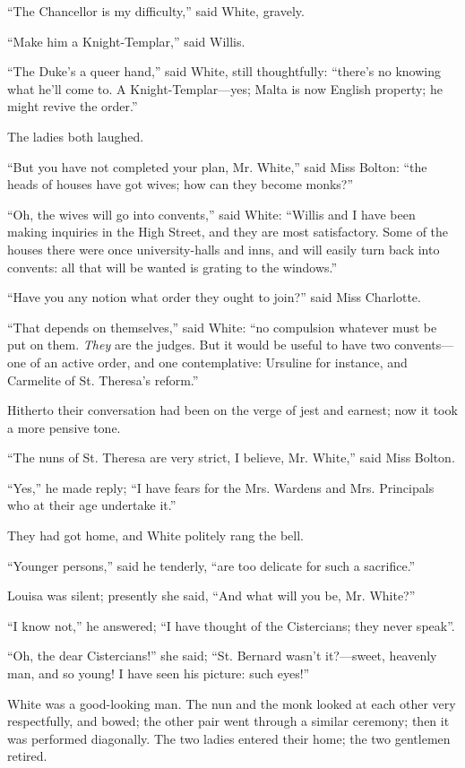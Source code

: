 ``The Chancellor is my difficulty,'' said White, gravely.

``Make him a Knight-Templar,'' said Willis.

``The Duke's a queer hand,'' said White, still
thoughtfully: ``there's no knowing what he'll come to. A Knight-Templar—yes;
Malta is now English property; he might revive the order.''

The ladies both laughed.

``But you have not completed your plan, Mr. White,'' said
Miss Bolton: ``the heads of houses have got wives; how can they
become monks?''

``Oh, the wives will go into convents,'' said White:
``Willis and I have been making inquiries in the High Street, and
they are most satisfactory. Some of the houses there were once
university-halls and inns, and will easily turn back into convents:
all that will be wanted is grating to the windows.''

``Have you any notion what order they ought to join?'' said
Miss Charlotte.

``That depends on themselves,'' said White: ``no compulsion whatever must be put on them. \emph{They} are the judges.
But it would be useful to have two convents—one of an active order,
and one contemplative: Ursuline for instance, and Carmelite of St.
Theresa's reform.''

Hitherto their conversation had been on the verge of jest and
earnest; now it took a more pensive tone.

``The nuns of St. Theresa are very strict, I believe, Mr.
White,'' said Miss Bolton.

``Yes,'' he made reply; ``I have fears for the Mrs.
Wardens and Mrs. Principals who at their age undertake it.''

They had got home, and White politely rang the bell.

``Younger persons,'' said he tenderly, ``are too
delicate for such a sacrifice.''

Louisa was silent; presently she said, ``And what will you be,
Mr. White?''

``I know not,'' he answered; ``I have thought of the
Cistercians; they never speak''.

``Oh, the dear Cistercians!'' she said; ``St. Bernard
wasn't it?—sweet, heavenly man, and so young! I have seen his
picture: such eyes!''

White was a good-looking man. The nun and the monk looked at each
other very respectfully, and bowed; the other pair went through a
similar ceremony; then it was performed diagonally. The two ladies
entered their home; the two gentlemen retired.

